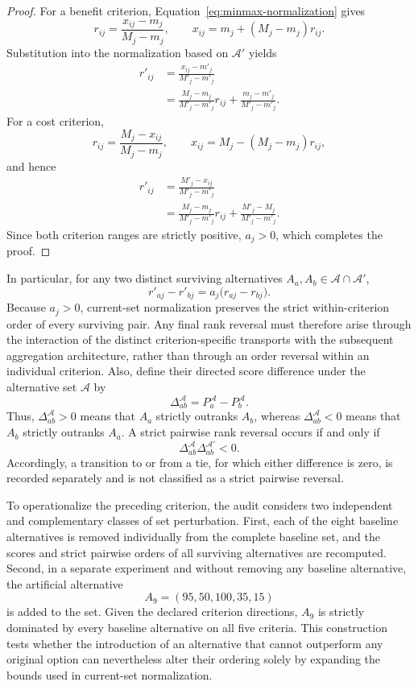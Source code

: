 \documentclass[reqno,11pt]{amsart}
\theoremstyle{definition}
\theoremstyle{plain}
\theoremstyle{remark}
\begin{document}
\begin{proof}
For a benefit criterion, Equation~\eqref{eq:minmax-normalization} gives
\[
r_{ij}=\frac{x_{ij}-m_j}{M_j-m_j},
\qquad
x_{ij}=m_j+(M_j-m_j)r_{ij}.
\]
Substitution into the normalization based on $\mathcal A'$ yields
\[
\begin{aligned}
r'_{ij}
&=\frac{x_{ij}-m'_j}{M'_j-m'_j}\\
&=\frac{M_j-m_j}{M'_j-m'_j}r_{ij}
+\frac{m_j-m'_j}{M'_j-m'_j}.
\end{aligned}
\]
For a cost criterion,
\[
r_{ij}=\frac{M_j-x_{ij}}{M_j-m_j},
\qquad
x_{ij}=M_j-(M_j-m_j)r_{ij},
\]
and hence
\[
\begin{aligned}
r'_{ij}
&=\frac{M'_j-x_{ij}}{M'_j-m'_j}\\
&=\frac{M_j-m_j}{M'_j-m'_j}r_{ij}
+\frac{M'_j-M_j}{M'_j-m'_j}.
\end{aligned}
\]
Since both criterion ranges are strictly positive, $a_j>0$, which
completes the proof.
\end{proof}

In particular, for any two distinct surviving alternatives
$A_a,A_b\in\mathcal A\cap\mathcal A'$,
\[
r'_{aj}-r'_{bj}
=
a_j\bigl(r_{aj}-r_{bj}\bigr).
\]
Because $a_j>0$, current-set normalization preserves the strict
within-criterion order of every surviving pair. Any final rank reversal
must therefore arise through the interaction of the distinct
criterion-specific transports with the subsequent aggregation
architecture, rather than through an order reversal within an
individual criterion. Also, define their directed score
difference under the alternative set $\mathcal A$ by
\[
\Delta_{ab}^{\mathcal A}
=
P_a^{\mathcal A}-P_b^{\mathcal A}.
\]
Thus, $\Delta_{ab}^{\mathcal A}>0$ means that $A_a$ strictly outranks
$A_b$, whereas $\Delta_{ab}^{\mathcal A}<0$ means that $A_b$ strictly
outranks $A_a$. A strict pairwise rank reversal occurs if and only if
\begin{equation}
\Delta_{ab}^{\mathcal A}
\Delta_{ab}^{\mathcal A'}<0.
\label{eq:strict-rank-reversal}
\end{equation}
Accordingly, a transition to or from a tie, for which either difference
is zero, is recorded separately and is not classified as a strict
pairwise reversal.


To operationalize the preceding criterion, the audit considers two independent 
and complementary classes of set perturbation. First, each of the eight baseline 
alternatives is removed individually from the complete baseline set, and the scores 
and strict pairwise orders of all surviving alternatives are recomputed. Second, 
in a separate experiment and without removing any baseline alternative, the 
artificial alternative
\[
A_9=(95,50,100,35,15)
\]
is added to the set. Given the declared criterion directions, \(A_9\) is strictly 
dominated by every baseline alternative on all five criteria. This construction 
tests whether the introduction of an alternative that cannot outperform any 
original option can nevertheless alter their ordering solely by expanding the 
bounds used in current-set normalization.
\end{document}
